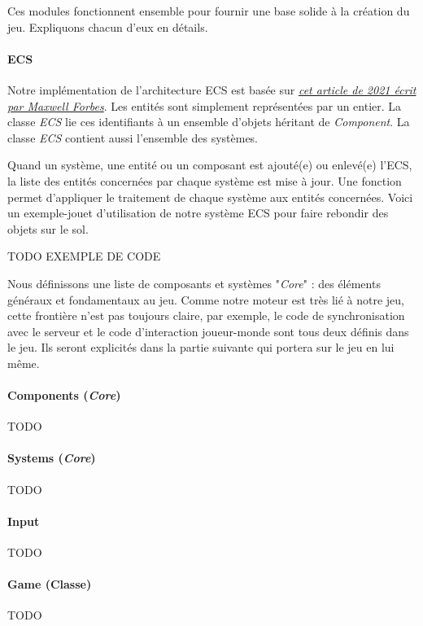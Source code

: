     Ces modules fonctionnent ensemble pour fournir une base solide à la création du jeu. Expliquons chacun d'eux en détails.
\paragraph{ECS}
    Notre implémentation de l'architecture ECS est basée sur \href{https://maxwellforbes.com/posts/typescript-ecs-implementation/}{\textit{cet article de 2021 écrit par Maxwell Forbes}}. Les entités sont simplement représentées par un entier. La classe \textit{ECS} lie ces identifiants à un ensemble d'objets héritant de \textit{Component}. La classe \textit{ECS} contient aussi l'ensemble des systèmes.
    
    Quand un système, une entité ou un composant est ajouté(e) ou enlevé(e) l'ECS, la liste des entités concernées par chaque système est mise à jour.
    Une fonction permet d'appliquer le traitement de chaque système aux entités concernées. Voici un exemple-jouet d'utilisation de notre système ECS pour faire rebondir des objets sur le sol.

    TODO EXEMPLE DE CODE
    
    Nous définissons une liste de composants et systèmes "\textit{Core}" : des éléments généraux et fondamentaux au jeu. Comme notre moteur est très lié à notre jeu, cette frontière n'est pas toujours claire, par exemple, le code de synchronisation avec le serveur et le code d’interaction joueur-monde sont tous deux définis dans le jeu. Ils seront explicités dans la partie suivante qui portera sur le jeu en lui même.
\paragraph{Components (\textit{Core})}
    TODO


\paragraph{Systems (\textit{Core})}
    TODO




\paragraph{Input}
    TODO
    


\paragraph{Game (Classe)}
    TODO